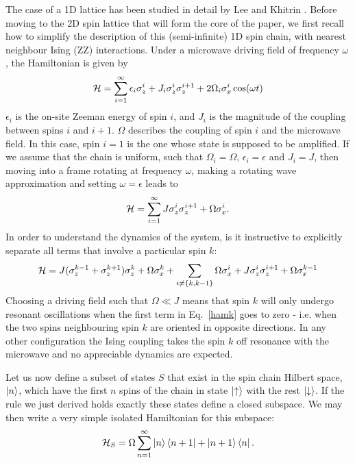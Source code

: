   The case of a 1D lattice has been studied in detail by Lee and Khitrin \cite{Lee:2005p6468}. Before moving to the 2D spin lattice that will form the core of the paper, we first recall how to simplify the description of this (semi-infinite) 1D spin chain, with nearest neighbour Ising (ZZ) interactions. Under a microwave driving field of frequency $\omega$, the Hamiltonian is given by
  \begin{equation} {\cal H} = \sum_{i=1}^{\infty} \epsilon_i \sigma^i_z
  + J_i \sigma_z^i\sigma_z^{i+1} + 2 \Omega_i \sigma_x^i \cos(\omega
      t)
  \end{equation}
  $\epsilon_i$ is the on-site Zeeman energy of spin $i$, and $J_i$ is the magnitude of the coupling between spins $i$ and $i+1$. $\Omega$ describes the coupling of spin $i$ and the microwave field. In this case, spin $i=1$ is the one whose state is supposed to be amplified. If we assume that the chain is uniform, such that $\Omega_i = \Omega$, $\epsilon_i = \epsilon$ and $J_i = J$, then moving into a frame rotating at frequency $\omega$, making a rotating wave approximation and setting $\omega = \epsilon$ leads to
  \begin{equation} {\cal H} = \sum_{i=1}^{\infty} J
  \sigma_z^i\sigma_z^{i+1} + \Omega \sigma_x^i .
  \end{equation}
  In order to understand the dynamics of the system, is it instructive to explicitly separate all terms that involve a particular spin $k$:
  \begin{equation} {\cal H} = J (\sigma_z^{k-1} +
      \sigma_z^{k+1})\sigma_z^k + \Omega \sigma^k_x + \sum_{i \neq \{k,
    k-1\}} \Omega\sigma_x^i + J \sigma_z^i\sigma_z^{i+1} +
    \Omega\sigma_x^{k-1}
    \label{hamk}
    \end{equation}
    Choosing a driving field such that $\Omega\ll J$ means that spin $k$ will only undergo resonant oscillations when the first term in Eq.~\ref{hamk} goes to zero - i.e. when the two spins neighbouring spin $k$ are oriented in opposite directions. In any other configuration the Ising coupling takes the spin $k$ off resonance with the microwave and no appreciable dynamics are expected.

    Let us now define a subset of states $S$ that exist in the spin chain Hilbert space, $\left\vert n\right\rangle$, which have the first $n$ spins of the chain in state $\left\vert\uparrow\right\rangle$ with the rest $\left\vert\downarrow\right\rangle$. If the rule we just derived holds exactly these states define a closed subspace. We may then write a very simple isolated Hamiltonian for this subspace:
    \begin{equation}
{\cal H}_S = \Omega \sum_{n=1}^\infty \left\vert n\right\rangle\left\langle  n+1\right\vert+\left\vert n+1\right\rangle\left\langle  n\right\vert.
\label{1d_ham}
\end{equation}

